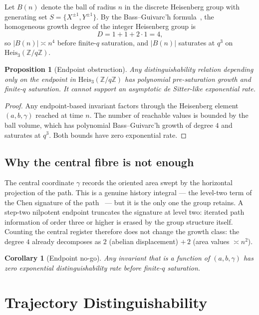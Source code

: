 \documentclass[11pt]{article}
\newtheorem{proposition}{Proposition}
\newtheorem{corollary}{Corollary}
\newcommand{\Heis}{\mathrm{Heis}_3}
\newcommand{\Zq}{\mathbb{Z}/q\mathbb{Z}}
\begin{document}
Let $B(n)$ denote the ball of radius $n$ in the discrete Heisenberg group with generating set
$S=\{X^{\pm1},Y^{\pm1}\}$.
By the Bass--Guivarc'h formula~\cite{Bass1972,Guivarch1973}, the homogeneous growth degree of the integer
Heisenberg group is
\[
D = 1+1+2\cdot 1 = 4 ,
\]
so $|B(n)| \asymp n^4$ before finite-$q$ saturation, and $|B(n)|$ saturates at $q^3$ on $\Heis(\Zq)$.

\begin{proposition}[Endpoint obstruction]
\label{prop:endpoint-obstruction}
Any distinguishability relation depending only on the endpoint in $\Heis(\Zq)$ has polynomial pre-saturation
growth and finite-$q$ saturation.
It cannot support an asymptotic de Sitter-like exponential rate.
\end{proposition}

\begin{proof}
Any endpoint-based invariant factors through the Heisenberg element $(a,b,\gamma)$ reached at time $n$.
The number of reachable values is bounded by the ball volume, which has polynomial Bass--Guivarc'h growth of
degree $4$ and saturates at $q^3$.
Both bounds have zero exponential rate.
\end{proof}

\subsection{Why the central fibre is not enough}
\label{sec:central-fibre}

The central coordinate $\gamma$ records the oriented area swept by the horizontal projection of the path.
This is a genuine history integral --- the level-two term of the Chen signature of the path~\cite{Chen1957}
--- but it is the only one the group retains.
A step-two nilpotent endpoint truncates the signature at level two: iterated path information of order three
or higher is erased by the group structure itself.
Counting the central register therefore does not change the growth class: the degree $4$ already decomposes
as $2$ (abelian displacement) $+\,2$ (area values $\asymp n^2$).

\begin{corollary}[Endpoint no-go]
\label{cor:endpoint-nogo}
Any invariant that is a function of $(a,b,\gamma)$ has zero exponential distinguishability rate before
finite-$q$ saturation.
\end{corollary}

\section{Trajectory Distinguishability}
\label{sec:distinguishability}
\end{document}
